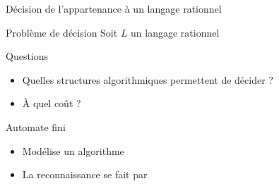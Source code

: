 
\begingroup

\begin{frame}{Décision de l'appartenance à un langage rationnel}

  \begin{block}{Problème de décision}
    Soit $L$ un langage rationnel
    
  \end{block}

  \begin{alertblock}{Questions}
    \begin{itemize}
    \item Quelles structures algorithmiques permettent de décider  ?
    \item À quel coût ?
    \end{itemize}
  \end{alertblock}

  \begin{block}{Automate fini}
    \begin{itemize}
    \item Modélise un algorithme 
    \item La reconnaissance se fait par 
    \end{itemize}
  \end{block}

\end{frame}

\endgroup
\endinput
